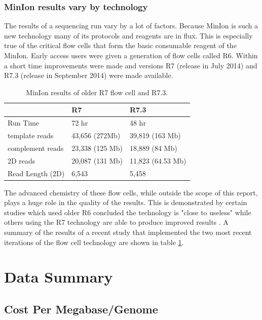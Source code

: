 \documentclass[12pt,letterpaper]{report}
\begin{document}
\subsubsection{MinIon results vary by technology}

The results of a sequencing run vary by a lot of factors. Because MinIon is such a new technology many of its protocols and reagents are in flux. This is especially true of the critical flow cells that form the basic consumable reagent of the MinIon. Early access users were given a generation of flow cells called R6. Within a short time improvements were made and versions R7 (release in July 2014) and R7.3 (release in September 2014) were made available. 

\begin{table}
\vspace{-20pt}
\begin{center}
\begin{tabular}{lll}
\hline
 & R7 & R7.3 \\
\hline
Run Time & 72 hr & 48 hr \\
template reads & 43,656 (272Mb) & 39,819 (163 Mb) \\
complement reads & 23,338 (125 Mb) & 18,889 (84 Mb) \\
2D reads & 20,087 (131 Mb) & 11,823 (64.53 Mb) \\
Read Length (2D) & 6,543 & 5,458 \\
\hline
\end{tabular}
\caption{MinIon results of older R7 flow cell and R7.3.}
\end{center}
\label{table:summary_nanopore}
\end{table}

The advanced chemistry of these flow cells, while outside the scope of this report, plays a huge role in the quality of the results. This is demonstrated by certain studies which used older R6 concluded the technology is "close to useless"\cite{Mikheyev} while others using the R7 technology are able to produce improved results \cite{Quick}. A summary of the results of a recent study that implemented the two most recent iterations of the flow cell technology are shown in table \ref{table:summary_nanopore}.

\section{Data Summary}

\subsection{Cost Per Megabase/Genome}
\end{document}
